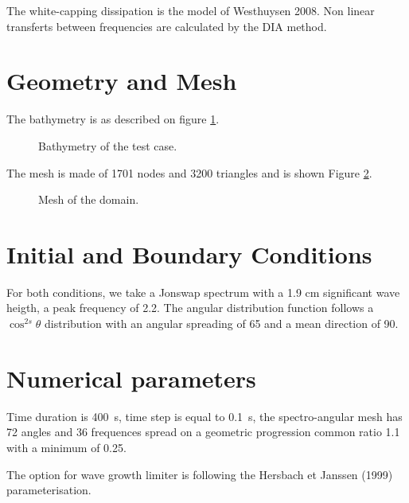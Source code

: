 The white-capping dissipation is the model of Westhuysen 2008. Non linear
transferts between frequencies are calculated by the DIA method.

%
%
%
\section{Geometry and Mesh}
%
The bathymetry is as described on figure \ref{bathyop}.
\begin{figure} [!h]
\centering
{}
 \caption{Bathymetry of the test case.}
\label{bathyop}
\end{figure}

The mesh is made of 1701 nodes and 3200 triangles  and is shown Figure
\ref{mailop}.
\begin{figure} [!h]
\centering
{}
 \caption{Mesh of the domain.}
\label{mailop}
\end{figure}




%
%
\section{Initial and Boundary Conditions}
%
For both conditions, we take a Jonswap spectrum with a 1.9 cm significant wave
heigth, a peak frequency of 2.2. The angular distribution function follows a
$\cos^{2s} \theta$ distribution with an angular spreading of 65 and a mean
direction of 90.
%
%
\section{Numerical parameters}
%
Time duration is 400~s, time step is equal to 0.1~s, the spectro-angular mesh
has 72 angles and 36 frequences spread on a geometric progression common ratio
1.1 with a minimum of 0.25.

The option for wave growth limiter is following the Hersbach et Janssen (1999)
parameterisation.

%
%
